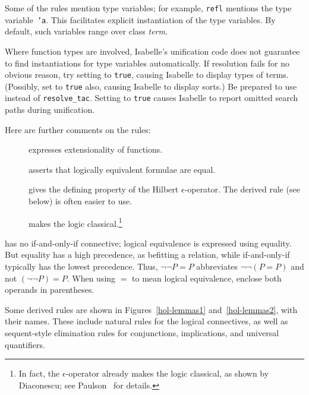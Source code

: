 Some of the rules mention type variables; for example, {\tt refl} mentions
the type variable~{\tt'a}.  This facilitates explicit instantiation of the
type variables.  By default, such variables range over class {\it term}.  

\begin{warn}
Where function types are involved, Isabelle's unification code does not
guarantee to find instantiations for type variables automatically.  If
resolution fails for no obvious reason, try setting  to
{\tt true}, causing Isabelle to display types of terms.  (Possibly, set
 to {\tt true} also, causing Isabelle to display sorts.)
Be prepared to use  instead of {\tt resolve_tac}.
Setting  to {\tt true} causes Isabelle to
report omitted search paths during unification.
\end{warn}

Here are further comments on the rules:
\begin{description}
\item[] 
expresses extensionality of functions.
\item[] 
asserts that logically equivalent formulae are equal.
\item[] 
gives the defining property of the Hilbert $\epsilon$-operator.  The
derived rule  (see below) is often easier to use.
\item[] 
makes the logic classical.\footnote{In fact, the $\epsilon$-operator
already makes the logic classical, as shown by Diaconescu;
see Paulson~\cite{paulson-COLOG} for details.}
\end{description}

\begin{warn}
{\HOL} has no if-and-only-if connective; logical equivalence is expressed
using equality.  But equality has a high precedence, as befitting a
relation, while if-and-only-if typically has the lowest precedence.  Thus,
$\neg\neg P=P$ abbreviates $\neg\neg (P=P)$ and not $(\neg\neg P)=P$.  When
using $=$ to mean logical equivalence, enclose both operands in
parentheses.
\end{warn}

Some derived rules are shown in Figures~\ref{hol-lemmas1}
and~\ref{hol-lemmas2}, with their {\ML} names.  These include natural rules
for the logical connectives, as well as sequent-style elimination rules for
conjunctions, implications, and universal quantifiers.  

